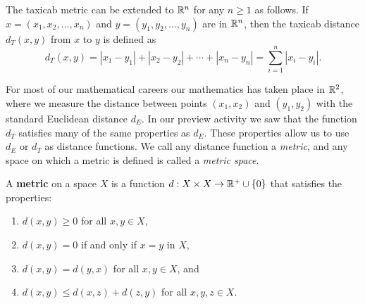 \begin{comment}
\item A point $(x_1,x_2)$ will be a distance 1 from the origin if $|x_1| + |x_2| = 1$. This will only happen if 
\[|x_2| = 1- |x_1| \text{ and } -1 \leq x_1, x_2 \leq 1.\]
In other words, the point $(x_1,x_2)$ must lie on one of the lines 
\begin{align*}
x_2 &= 1-x_1 \text{ if } x_1, x_2 \geq 0 \\
x_2 &= 1+x_1 \text{ if } x_1<0 \text{ and } x_2 \geq 0 \\
x_2 &= -1+x_1 \text{ if } x_1\geq 0 \text{ and } x_2 < 0 \\
x_2 &= -1-x_1 \text{ if } x_1, x_2 \leq 0.
\end{align*}
So the unit circle using the metric $d_T$ in $\R^2$ looks as depicted in Figure \ref{F:taxicab_circle}.
\begin{figure}[ht]
\begin{center}
\resizebox{!}{2.0in}{\texttt{[image: Taxicab\_circle]}}
\end{center}
\caption{The unit circle in $\R^2$ using the taxicab metric.}
\label{F:taxicab_circle}
\end{figure}
	
\ee


\end{comment}

The taxicab metric can be extended to $\mathbb{R}^n$ for any $n \geq 1$ as follows. If $x = (x_1, x_2, \ldots, x_n)$ and $y = (y_1, y_2, \ldots, y_n)$ are in $\mathbb{R}^n$, then the taxicab distance $d_T(x,y)$ from $x$ to $y$ is defined as
\[d_T(x,y) = |x_1-y_1| + |x_2-y_2| + \cdots + |x_n-y_n| = \sum_{i=1}^n |x_i-y_i|.\]


\label{sec_metric_space}

For most of our mathematical careers our mathematics has taken place in $\mathbb{R}^2$, where we measure the distance between points $(x_1,x_2)$ and $(y_1,y_2)$ with the standard Euclidean distance $d_E$. In our preview activity we saw that the function $d_T$ satisfies many of the same properties as $d_E$. These properties allow us to use $d_E$ or $d_T$ as distance functions. We call any distance function a \emph{metric}, and any space on which a metric is defined is called a \emph{metric space}. 

\begin{definition} A \textbf{metric} on a space $X$ is a function $d : X \times X \to \mathbb{R}^+ \cup \{0\}$ that satisfies the properties: 
\begin{enumerate}
\item $d(x,y) \geq 0$ for all $x,y \in X$,
\item $d(x,y) = 0$ if and only if $x = y$ in $X$,
\item $d(x,y) = d(y,x)$ for all $x, y \in X$, and
\item $d(x,y) \leq d(x,z) + d(z,y)$ for all $x,y,z \in X$.
\end{enumerate}
\end{definition}

